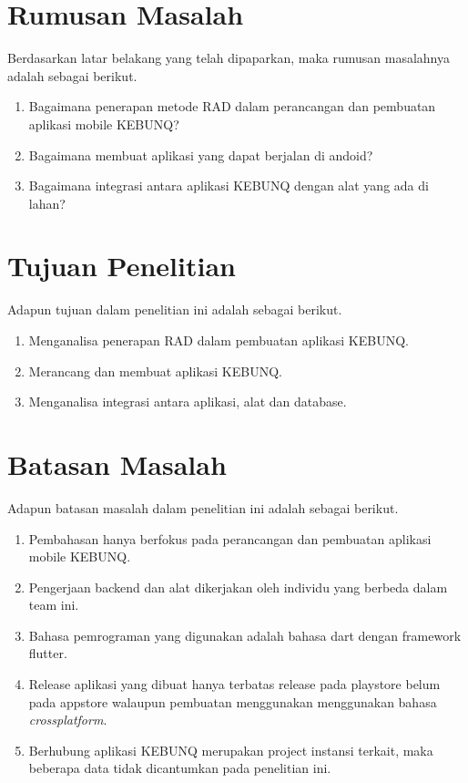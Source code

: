 \begin{flushleft}
\section{Rumusan Masalah}
\begin{justify}
  Berdasarkan latar belakang yang telah dipaparkan, maka rumusan masalahnya adalah sebagai berikut.
\end{justify}
\begin{enumerate}
  \item Bagaimana penerapan metode RAD dalam perancangan dan pembuatan aplikasi mobile KEBUNQ?
  \item Bagaimana membuat aplikasi yang dapat berjalan di andoid?
  \item Bagaimana integrasi antara aplikasi KEBUNQ dengan alat yang ada di lahan?
  
  
\end{enumerate}
\vspace{2cm}

\section{Tujuan Penelitian}

\begin{justify}
  Adapun tujuan dalam penelitian ini adalah sebagai berikut.


\end{justify}
\begin{enumerate}
  \item Menganalisa penerapan RAD dalam pembuatan aplikasi KEBUNQ.
  \item Merancang dan membuat aplikasi KEBUNQ.
  \item Menganalisa integrasi antara aplikasi, alat dan database.
  
  \end{enumerate}
\vspace{2cm}

\section{Batasan Masalah}

\begin{justify}
  Adapun batasan masalah dalam penelitian ini adalah sebagai berikut.


\end{justify}
\begin{enumerate}
  \item Pembahasan hanya berfokus pada perancangan dan pembuatan aplikasi mobile KEBUNQ.
  \item Pengerjaan backend dan alat dikerjakan oleh individu yang berbeda dalam team ini.
  \item Bahasa pemrograman yang digunakan adalah bahasa dart dengan framework flutter.
  \item Release aplikasi yang dibuat hanya terbatas release pada playstore belum pada appstore walaupun pembuatan menggunakan menggunakan bahasa \textit{crossplatform}.
  \item Berhubung aplikasi KEBUNQ merupakan project instansi terkait, maka beberapa data tidak dicantumkan pada penelitian ini.


\end{enumerate}
\end{flushleft}
